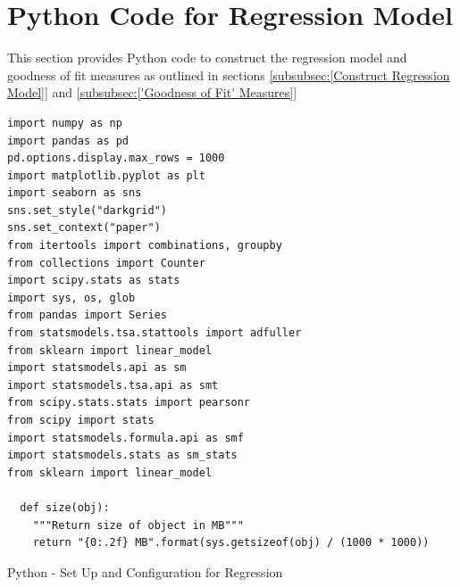 \documentclass[12pt]{scrartcl}
\begin{document}
\section{Python Code for Regression Model}
\label{sec:[Python Code for Regression Model]}
This section provides Python code to construct the regression model and goodness of fit measures as outlined in sections \ref{subsubsec:[Construct Regression Model]} and \ref{subsubsec:['Goodness of Fit' Measures]}

\begin{listing}[H]
\begin{verbatim}
import numpy as np
import pandas as pd 
pd.options.display.max_rows = 1000
import matplotlib.pyplot as plt
import seaborn as sns
sns.set_style("darkgrid")
sns.set_context("paper")
from itertools import combinations, groupby
from collections import Counter
import scipy.stats as stats
import sys, os, glob
from pandas import Series
from statsmodels.tsa.stattools import adfuller
from sklearn import linear_model
import statsmodels.api as sm
import statsmodels.tsa.api as smt
from scipy.stats.stats import pearsonr
from scipy import stats
import statsmodels.formula.api as smf
import statsmodels.stats as sm_stats
from sklearn import linear_model

  def size(obj):
    """Return size of object in MB"""
    return "{0:.2f} MB".format(sys.getsizeof(obj) / (1000 * 1000))
\end{verbatim}
\caption{Python - Set Up and Configuration for Regression}
\label{list:[Python - Set up and Configuration for Regression]}
\end{listing}
\end{document}
